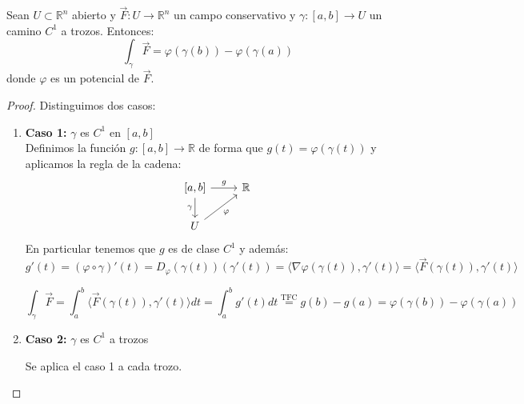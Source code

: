 \begin{proposición}
Sean $U \subset \mathbb{R}^n$ abierto y $\vec{F}: U \to \mathbb{R}^n$ un campo conservativo y $\gamma: [a,b] \to U$ un camino $C^1$ a trozos. Entonces:
$$\int_{\gamma} \vec{F} = \varphi(\gamma(b)) - \varphi(\gamma(a))$$
donde $\varphi$ es un potencial de $\vec{F}$.
\end{proposición}

\begin{proof}
    Distinguimos dos casos:
    \begin{enumerate}
        \item \textbf{Caso 1:} $\gamma$ es $C^1$ en $[a,b]$\\
              Definimos la función $g: [a,b] \to \mathbb{R}$ de forma que $g(t) = \varphi(\gamma(t))$ y aplicamos la regla de la cadena:
              \[
                  \begin{tikzcd}
                      {[a,b]} \arrow[d, "\gamma"'] \arrow[r, "g"] & \mathbb{R} \\
                      U \arrow[ru, "\varphi"']
                  \end{tikzcd}
              \]
              En particular tenemos que $g$ es de clase $C^1$ y además:
              \[
                  g'(t) = (\varphi \circ \gamma)'(t) = D_\varphi (\gamma(t)) (\gamma'(t)) = \langle \nabla \varphi (\gamma(t)), \gamma'(t) \rangle = \langle \vec{F}(\gamma(t)), \gamma'(t) \rangle
              \]

              \[
                  \int_{\gamma} \vec{F} = \int_{a}^{b} \langle \vec{F} (\gamma(t)), \gamma'(t) \rangle dt = \int_{a}^{b} g'(t) dt \overset{\text{TFC}}{=} g(b) - g(a) = \varphi (\gamma(b)) - \varphi (\gamma(a))
              \]

        \item \textbf{Caso 2:} \(\gamma\) es \(C^1\) a trozos

              Se aplica el caso 1 a cada trozo.
    \end{enumerate}
\end{proof}

